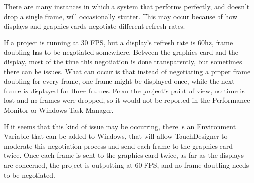 \begin{fullwidth}
There are many instances in which a system that performs perfectly, and doesn't drop a single frame, will occasionally stutter. This may occur because of how displays and graphics cards negotiate different refresh rates. 

If a project is running at 30 FPS, but a display's refresh rate is 60hz, frame doubling has to be negotiated somewhere. Between the graphics card and the display, most of the time this negotiation is done transparently, but sometimes there can be issues. What can occur is that instead of negotiating a proper frame doubling for every frame, one frame might be displayed once, while the next frame is displayed for three frames. From the project's point of view, no time is lost and no frames were dropped, so it would not be reported in the Performance Monitor or Windows Task Manager. 

If it seems that this kind of issue may be occurring, there is an Environment Variable that can be added to Windows, that will allow TouchDesigner to moderate this negotiation process and send each frame to the graphics card twice. Once each frame is sent to the graphics card twice, as far as the displays are concerned, the project is outputting at 60 FPS, and no frame doubling needs to be negotiated. 


\end{fullwidth}